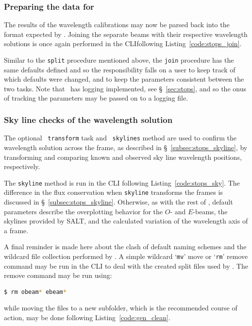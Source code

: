\subsubsection{Preparing the data for \polsalt}

The results of the wavelength calibrations may now be parsed back into the format expected by \polsalt. Joining the separate beams with their respective wavelength solutions is once again performed in the \gls{CLI}following Listing~\ref{code:stops_join}.

Similar to the \texttt{split} procedure mentioned above, the \texttt{join} procedure has the same defaults defined and so the responsibility falls on a user to keep track of which defaults were changed, and to keep the parameters consistent between the two tasks. Note that \stops\ has logging implemented, see \S~\ref{sec:stops}, and so the onus of tracking the parameters may be passed on to a logging file.

\subsubsection{Sky line checks of the wavelength solution}

The optional \iraf\ \texttt{transform} task and \stops\ \texttt{skylines} method are used to confirm the wavelength solution across the frame, as described in \S~\ref{subsec:stops_skyline}, by transforming and comparing known and observed sky line wavelength positions, respectively.

The \texttt{skyline} method is run in the \gls{CLI} following Listing~\ref{code:stops_sky}. The difference in the flux conservation when \texttt{skyline} transforms the frames is discussed in \S~\ref{subsec:stops_skyline}. Otherwise, as with the rest of \stops, default parameters describe the overplotting behavior for the $O$- and $E$-beams, the skylines provided by \gls{SALT}, and the calculated variation of the wavelength axis of a frame.

A final reminder is made here about the clash of default naming schemes and the wildcard file collection performed by \polsalt. A simple wildcard `\texttt{mv}' move or `\texttt{rm}' remove command may be run in the \gls{CLI} to deal with the created split files used by \iraf. The remove command may be run using:
\begin{lstlisting}[language=bash]
$ rm obeam* ebeam*
\end{lstlisting}
{\parskip=0pt while} moving the files to a new subfolder, which is the recommended course of action, may be done following Listing~\ref{code:gen_clean}.

